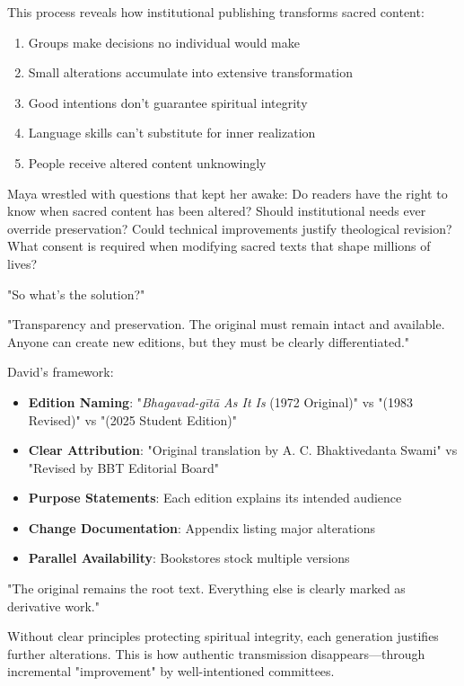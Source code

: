 \documentclass[12pt,twoside]{book}
\begin{document}
This process reveals how institutional publishing transforms sacred content:

\begin{enumerate}
\item Groups make decisions no individual would make
\item Small alterations accumulate into extensive transformation
\item Good intentions don't guarantee spiritual integrity
\item Language skills can't substitute for inner realization
\item People receive altered content unknowingly
\end{enumerate}

Maya wrestled with questions that kept her awake: Do readers have the right to know when sacred content has been altered? Should institutional needs ever override preservation? Could technical improvements justify theological revision? What consent is required when modifying sacred texts that shape millions of lives?

"So what's the solution?"

"Transparency and preservation. The original must remain intact and available. Anyone can create new editions, but they must be clearly differentiated."

David's framework:

\begin{itemize}
\item \textbf{\textbf{Edition Naming}}: "\emph{Bhagavad-gītā As It Is} (1972 Original)" vs "(1983 Revised)" vs "(2025 Student Edition)"
\item \textbf{\textbf{Clear Attribution}}: "Original translation by A. C. Bhaktivedanta Swami" vs "Revised by BBT Editorial Board"
\item \textbf{\textbf{Purpose Statements}}: Each edition explains its intended audience
\item \textbf{\textbf{Change Documentation}}: Appendix listing major alterations
\item \textbf{\textbf{Parallel Availability}}: Bookstores stock multiple versions
\end{itemize}

"The original remains the root text. Everything else is clearly marked as derivative work."

Without clear principles protecting spiritual integrity, each generation justifies further alterations. This is how authentic transmission disappears—through incremental "improvement" by well-intentioned committees.
\end{document}
